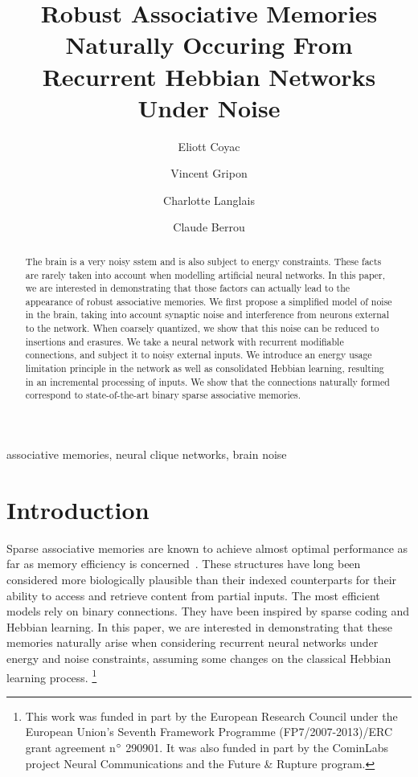 \documentclass[journal]{IEEEtran}
\newcommand\blfootnote[1]{%
  \begingroup
  \renewcommand\thefootnote{}\footnote{#1}%
  \addtocounter{footnote}{-1}%
  \endgroup
}
\begin{document}
\author{Eliott Coyac}
\author{Vincent Gripon}
\author{Charlotte Langlais}
\author{Claude Berrou}


\title{Robust Associative Memories Naturally Occuring From Recurrent Hebbian Networks Under Noise}

\maketitle

\begin{abstract}

  The brain is a very noisy sstem and is also subject to energy constraints. These facts are rarely taken into account when modelling artificial neural networks. In this paper, we are interested in demonstrating that those factors can actually lead to the appearance of robust associative memories. We first propose a simplified model of noise in the brain, taking into account synaptic noise and interference from neurons external to the network. When coarsely quantized, we show that this noise can be reduced to insertions and erasures. %
We take a neural network with recurrent modifiable connections, and subject it to noisy external inputs. We introduce an energy usage limitation principle in the network as well as consolidated Hebbian learning, resulting in an incremental processing of inputs. We show that the connections naturally formed correspond to state-of-the-art binary sparse associative memories.

\end{abstract}

\begin{IEEEkeywords}
  associative memories, neural clique networks, brain noise
\end{IEEEkeywords}

\section{Introduction}

Sparse associative memories are known to achieve almost optimal performance as far as memory efficiency is concerned~\cite{gripon2015comparative}. These structures have long been considered more biologically plausible than their indexed counterparts for their ability to access and retrieve content from partial inputs. The most efficient models rely on binary connections\cite{}. They have been inspired by sparse coding and Hebbian learning. In this paper, we are interested in demonstrating that these memories naturally arise when considering recurrent neural networks under energy and noise constraints, assuming some changes on the classical Hebbian learning process.
\blfootnote{This work was funded in part by the European Research Council under the European Union's Seventh Framework Programme (FP7/2007-2013)/ERC grant agreement n$\degree$ 290901. It was also funded in part by the CominLabs project Neural Communications and the Future \& Rupture program.}
\end{document}
